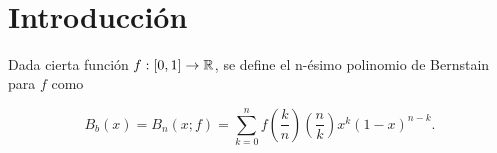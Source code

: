 %

\

\chapter{Introducción}\label{ch:introduccion}
\begin{definition} \label{def:Bernstein}
    Dada cierta función $f: [0,1] \rightarrow \mathbb{R}$, se define el n-ésimo polinomio de Bernstain para $f$ como 

    $$B_b(x) = B_n(x;f)=\sum_ {k=0}^{n} f \left( \frac{k}{n} \right) \left( \frac{n}{k} \right) x^k (1-x)^{n-k}.$$

\end{definition}
\endinput
